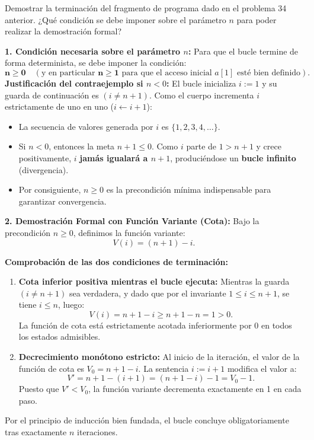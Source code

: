 \begin{ejercicio}
Demostrar la terminación del fragmento de programa dado en el problema 34 anterior. ¿Qué condición se debe imponer sobre el parámetro $n$ para poder realizar la demostración formal?
\end{ejercicio}

\begin{solucion}
\textbf{1. Condición necesaria sobre el parámetro $n$:}
Para que el bucle termine de forma determinista, se debe imponer la condición:
\[
\mathbf{n \ge 0} \quad (\text{y en particular } \mathbf{n \ge 1} \text{ para que el acceso inicial } a[1] \text{ esté bien definido}).
\]
\textbf{Justificación del contraejemplo si $n < 0$:}
El bucle inicializa $i := 1$ y su guarda de continuación es $(i \neq n + 1)$. Como el cuerpo incrementa $i$ estrictamente de uno en uno ($i \leftarrow i + 1$):
\begin{itemize}
    \item La secuencia de valores generada por $i$ es $\{1, 2, 3, 4, \dots\}$.
    \item Si $n < 0$, entonces la meta $n + 1 \le 0$. Como $i$ parte de $1 > n + 1$ y crece positivamente, $i$ \textbf{jamás igualará a $n + 1$}, produciéndose un \textbf{bucle infinito} (divergencia).
    \item Por consiguiente, $n \ge 0$ es la precondición mínima indispensable para garantizar convergencia.
\end{itemize}

\textbf{2. Demostración Formal con Función Variante (Cota):}
Bajo la precondición $n \ge 0$, definimos la función variante:
\[
V(i) = (n + 1) - i.
\]

\textbf{Comprobación de las dos condiciones de terminación:}
\begin{enumerate}
    \item \textbf{Cota inferior positiva mientras el bucle ejecuta:}
    Mientras la guarda $(i \neq n + 1)$ sea verdadera, y dado que por el invariante $1 \le i \le n + 1$, se tiene $i \le n$, luego:
    \[
    V(i) = n + 1 - i \ge n + 1 - n = 1 > 0.
    \]
    La función de cota está estrictamente acotada inferiormente por 0 en todos los estados admisibles.
    
    \item \textbf{Decrecimiento monótono estricto:}
    Al inicio de la iteración, el valor de la función de cota es $V_0 = n + 1 - i$.
    La sentencia $i := i + 1$ modifica el valor a:
    \[
    V' = n + 1 - (i + 1) = (n + 1 - i) - 1 = V_0 - 1.
    \]
    Puesto que $V' < V_0$, la función variante decrementa exactamente en 1 en cada paso.
\end{enumerate}

Por el principio de inducción bien fundada, el bucle concluye obligatoriamente tras exactamente $n$ iteraciones.
\end{solucion}
